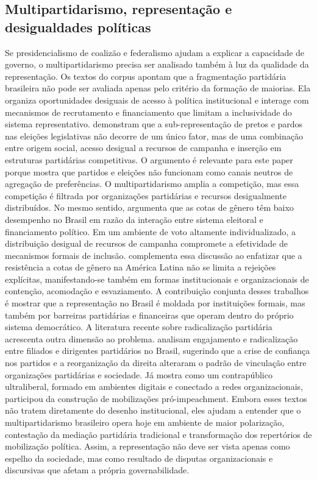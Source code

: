 \documentclass[12pt,a4paper]{article}
\begin{document}
\subsection{Multipartidarismo, representação e desigualdades políticas}
\label{sec:orge565ff3}
Se presidencialismo de coalizão e federalismo ajudam a explicar a capacidade de governo, o multipartidarismo precisa ser analisado também à luz da qualidade da representação. Os textos do corpus apontam que a fragmentação partidária brasileira não pode ser avaliada apenas pelo critério da formação de maiorias. Ela organiza oportunidades desiguais de acesso à política institucional e interage com mecanismos de recrutamento e financiamento que limitam a inclusividade do sistema representativo.
\textcite{campos2017_o_que} demonstram que a sub-representação de pretos e pardos nas eleições legislativas não decorre de um único fator, mas de uma combinação entre origem social, acesso desigual a recursos de campanha e inserção em estruturas partidárias competitivas. O argumento é relevante para este paper porque mostra que partidos e eleições não funcionam como canais neutros de agregação de preferências. O multipartidarismo amplia a competição, mas essa competição é filtrada por organizações partidárias e recursos desigualmente distribuídos.
No mesmo sentido, \textcite{sacchet2018_why_gender} argumenta que as cotas de gênero têm baixo desempenho no Brasil em razão da interação entre sistema eleitoral e financiamento político. Em um ambiente de voto altamente individualizado, a distribuição desigual de recursos de campanha compromete a efetividade de mecanismos formais de inclusão. \textcite{gatto2025_resistance_to} complementa essa discussão ao enfatizar que a resistência a cotas de gênero na América Latina não se limita a rejeições explícitas, manifestando-se também em formas institucionais e organizacionais de contenção, acomodação e esvaziamento. A contribuição conjunta desses trabalhos é mostrar que a representação no Brasil é moldada por instituições formais, mas também por barreiras partidárias e financeiras que operam dentro do próprio sistema democrático.
A literatura recente sobre radicalização partidária acrescenta outra dimensão ao problema. \textcite{alves2024_rage_within} analisam engajamento e radicalização entre filiados e dirigentes partidários no Brasil, sugerindo que a crise de confiança nos partidos e a reorganização da direita alteraram o padrão de vinculação entre organizações partidárias e sociedade. Já \textcite{rocha2019_imposto_e} mostra como um contrapúblico ultraliberal, formado em ambientes digitais e conectado a redes organizacionais, participou da construção de mobilizações pró-impeachment. Embora esses textos não tratem diretamente do desenho institucional, eles ajudam a entender que o multipartidarismo brasileiro opera hoje em ambiente de maior polarização, contestação da mediação partidária tradicional e transformação dos repertórios de mobilização política. Assim, a representação não deve ser vista apenas como espelho da sociedade, mas como resultado de disputas organizacionais e discursivas que afetam a própria governabilidade.
\end{document}
